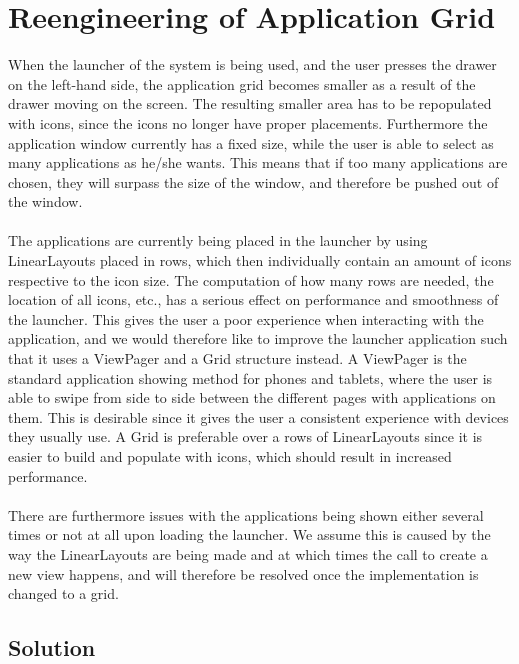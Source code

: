 
\section{Reengineering of Application Grid}
\label{sec:reengineering_of_application_grid}

When the launcher of the \giraf system is being used, and the user presses the drawer on the left-hand side, the application grid becomes smaller as a result of the drawer moving on the screen. The resulting smaller area has to be repopulated with icons, since the icons no longer have proper placements. Furthermore the application window currently has a fixed size, while the user is able to select as many applications as he/she wants. This means that if too many applications are chosen, they will surpass the size of the window, and therefore be pushed out of the window.
\\\\
The applications are currently being placed in the launcher by using LinearLayouts placed in rows, which then individually contain an amount of icons respective to the icon size. The computation of how many rows are needed, the location of all icons, etc., has a serious effect on performance and smoothness of the launcher. This gives the user a poor experience when interacting with the application, and we would therefore like to improve the launcher application such that it uses a ViewPager and a Grid structure instead. A ViewPager is the standard application showing method for phones and tablets, where the user is able to swipe from side to side between the different pages with applications on them. This is desirable since it gives the user a consistent experience with devices they usually use. A Grid is preferable over a rows of LinearLayouts since it is easier to build and populate with icons, which should result in increased performance. 
\\\\
There are furthermore issues with the applications being shown either several times or not at all upon loading the launcher. We assume this is caused by the way the LinearLayouts are being made and at which times the call to create a new view happens, and will therefore be resolved once the implementation is changed to a grid. 

\subsection{Solution}
\label{sub:reengineering_of_application_grid_solution}
